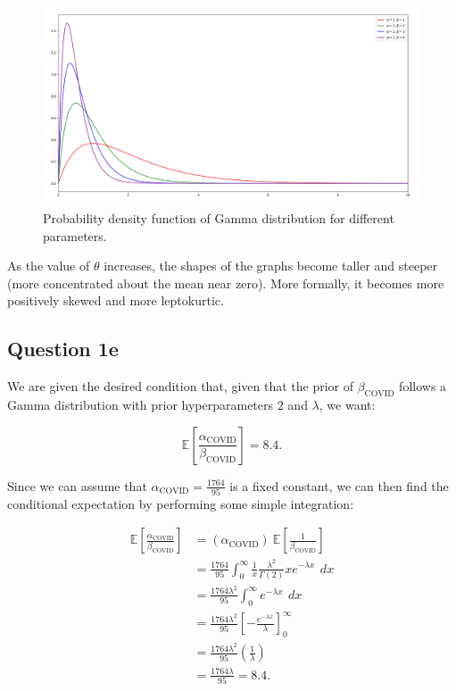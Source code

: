 \documentclass[11pt,fancychapters]{article}
\begin{document}
\begin{figure}[H]\label{fig:gamma_parameters}
\centering
\includegraphics[width=.9\textwidth]{diagrams/gamma.png}
\caption{Probability density function of Gamma distribution for different parameters.}
\label{fig:gamma_graph}
\end{figure}

As the value of $\theta$ increases, the shapes of the graphs become taller and steeper (more concentrated about the mean near zero). More formally, it becomes more positively skewed and more leptokurtic.

\subsection*{Question 1e}

We are given the desired condition that, given that the prior of $\beta_\text{COVID}$ follows a Gamma distribution with prior hyperparameters $2$ and $\lambda$, we want:

\begin{equation}\label{eqn1e1}
    \mathbb{E}\left[ \frac{\alpha_\text{COVID}}{\beta_\text{COVID}} \right] = 8.4.
\end{equation}

Since we can assume that $\alpha_\text{COVID} = \frac{1764}{95}$ is a fixed constant, we can then find the conditional expectation by performing some simple integration:

\begin{equation}\label{eqn1e2}
\begin{split}
    \mathbb{E}\left[ \frac{\alpha_\text{COVID}}{\beta_\text{COVID}} \right] & = (\alpha_\text{COVID}) ~ \mathbb{E} \left[ \frac{1}{\beta_\text{COVID}} \right] \\
    & = \frac{1764}{95} \int_{0}^{\infty} \frac{1}{x} \frac{\lambda^2}{\Gamma(2)} x e^{-\lambda x} ~ \,dx \\
    & = \frac{1764 \lambda^2}{95} \int_{0}^{\infty} e^{-\lambda x} ~ \,dx \\
    & = \frac{1764 \lambda^2}{95} \left[ - \frac{e^{-\lambda x}}{\lambda} \right]_0^\infty \\
    & = \frac{1764 \lambda^2}{95} \left( \frac{1}{\lambda} \right) \\
    & = \frac{1764 \lambda}{95} = 8.4.
\end{split}
\end{equation}
\end{document}
